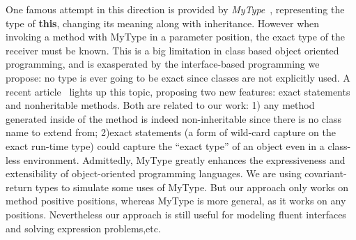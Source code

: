 One famous attempt in this direction is provided by
\emph{MyType}~\cite{bruce1994paradigmatic}, representing the type of
\textbf{this}, changing its meaning along with inheritance. However when
invoking a method with MyType in a parameter position, the exact type of the
receiver must be known.  This is a big limitation in class based object oriented
programming, and is exasperated by the interface-based programming we propose: no
type is ever going to be exact since classes are not explicitly used. A recent
article~\cite{Saito2013933} lights up this topic, proposing two
new features: exact statements and nonheritable methods. Both are
related to our work: 1) any method generated inside of the \Q@of@ method is indeed
non-inheritable since there is no class name to extend from; 2)exact
statements (a form of wild-card capture on the exact run-time type) could
capture the ``exact type'' of an object even in a class-less
environment. 
Admittedly, MyType greatly enhances the expressiveness and extensibility of
object-oriented programming languages. We are using covariant-return types to
simulate some uses of MyType. But our approach only works on method positive
positions, whereas MyType is more general, as it works on any
positions. Nevertheless our approach is still useful for modeling fluent
interfaces and solving expression problems,etc.


\begin{comment}
\subsection{Type-Directed Translations/Syntactic Sugar}
\marco{I'm tring to merge this and the next one}
Language extensions are often implemented as syntactic sugar of the base
language. For example, Scala compiler supports XML syntax in normal Scala code
directly (after Scala ?, users need to import \texttt{scala-xml} library
manually). However, this approach is hard in terms of implementation, because it
requires extending the compiler. Also, this approach does not support combining
multiple extensions into one.

SugarJ~\cite{erdweg11sugarj} is a Java-based extensible programming language
that allows programmers to extend the base language with custom language
features by definitions in meta-DSLs (SDF, Stratego, etc). 
\yanlin{Is new syntax really a ``drawback''? I think for some system, like
  SugarJ, one of purpose IS to introduce these new syntax.}  Drawbacks: new
syntax. To create the extension, programmers have to work with multiple
languages (SDF, stratego, etc) while our approach works totally in Java
environment.

We can model certain types of language extensions with annotations 
only, but those extensions do not introduce new syntax: they 
merely do automatic code generation. 
\end{comment}

